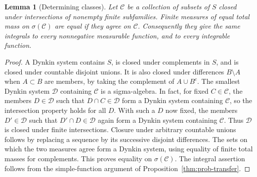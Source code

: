 \documentclass[11pt,oneside,openany]{book}
\theoremstyle{plain}
\newtheorem{lemma}[theorem]{Lemma}
\theoremstyle{definition}
\theoremstyle{remark}
\begin{document}
\begin{lemma}[Determining classes]
\label{lem:prob-pi-lambda}
Let \(\mathcal C\) be a collection of subsets of \(S\) closed under
intersections of nonempty finite subfamilies. Finite measures of equal total mass on
\(\sigma(\mathcal C)\) are equal if they agree on \(\mathcal C\).
Consequently they give the same integrals to every nonnegative
measurable function, and to every integrable function.
\end{lemma}
\begin{proof}
A Dynkin system contains \(S\), is closed under complements in \(S\),
and is closed under countable disjoint unions. It is also closed under
differences \(B\setminus A\) when \(A\subset B\) are members, by taking
the complement of \(A\cup B^c\). The smallest Dynkin system
\(\mathcal D\) containing \(\mathcal C\) is a sigma-algebra. In fact,
for fixed \(C\in\mathcal C\), the members \(D\in\mathcal D\) such that
\(D\cap C\in\mathcal D\) form a Dynkin system containing \(\mathcal C\),
so the intersection property holds for all \(D\). With such a \(D\)
now fixed, the members \(D'\in\mathcal D\) such that
\(D'\cap D\in\mathcal D\) again form a Dynkin system containing
\(\mathcal C\). Thus \(\mathcal D\) is closed under finite intersections.
Closure under arbitrary countable unions follows by replacing a
sequence by its successive disjoint differences. The sets on which
the two measures agree form a Dynkin system, using equality of finite
total masses for complements. This proves equality on
\(\sigma(\mathcal C)\). The integral assertion follows from the
simple-function argument of Proposition~\ref{thm:prob-transfer}.
\end{proof}
\end{document}
